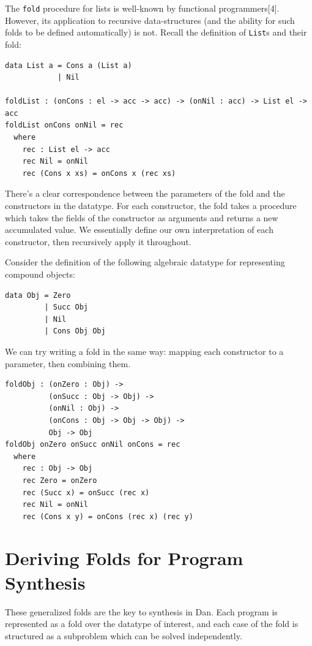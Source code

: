 \documentclass[acmsmall,screen]{acmart}
\begin{document}
The \texttt{fold} procedure for lists is well-known by functional programmers[4]. However, its application to recursive data-structures (and the ability for such folds to be defined automatically) is not. Recall the definition of \texttt{List}s and their fold:

\begin{verbatim}
data List a = Cons a (List a)
            | Nil

foldList : (onCons : el -> acc -> acc) -> (onNil : acc) -> List el -> acc
foldList onCons onNil = rec
  where
    rec : List el -> acc
    rec Nil = onNil
    rec (Cons x xs) = onCons x (rec xs)
\end{verbatim}

There's a clear correspondence between the parameters of the fold and the constructors in the datatype. For each constructor, the fold takes a procedure which takes the fields of the constructor as arguments and returns a new accumulated value. We essentially define our own interpretation of each constructor, then recursively apply it throughout.

Consider the definition of the following algebraic datatype for representing compound objects:

\begin{verbatim}
data Obj = Zero
         | Succ Obj
         | Nil
         | Cons Obj Obj
\end{verbatim}

We can try writing a fold in the same way: mapping each constructor to a parameter, then combining them.

\begin{Verbatim}
foldObj : (onZero : Obj) ->
          (onSucc : Obj -> Obj) ->
          (onNil : Obj) ->
          (onCons : Obj -> Obj -> Obj) ->
          Obj -> Obj
foldObj onZero onSucc onNil onCons = rec
  where
    rec : Obj -> Obj
    rec Zero = onZero
    rec (Succ x) = onSucc (rec x)
    rec Nil = onNil
    rec (Cons x y) = onCons (rec x) (rec y)
\end{Verbatim}

\section{Deriving Folds for Program Synthesis}

These generalized folds are the key to synthesis in Dan. Each program is represented as a fold over the datatype of interest, and each case of the fold is structured as a subproblem which can be solved independently. 
\end{document}

